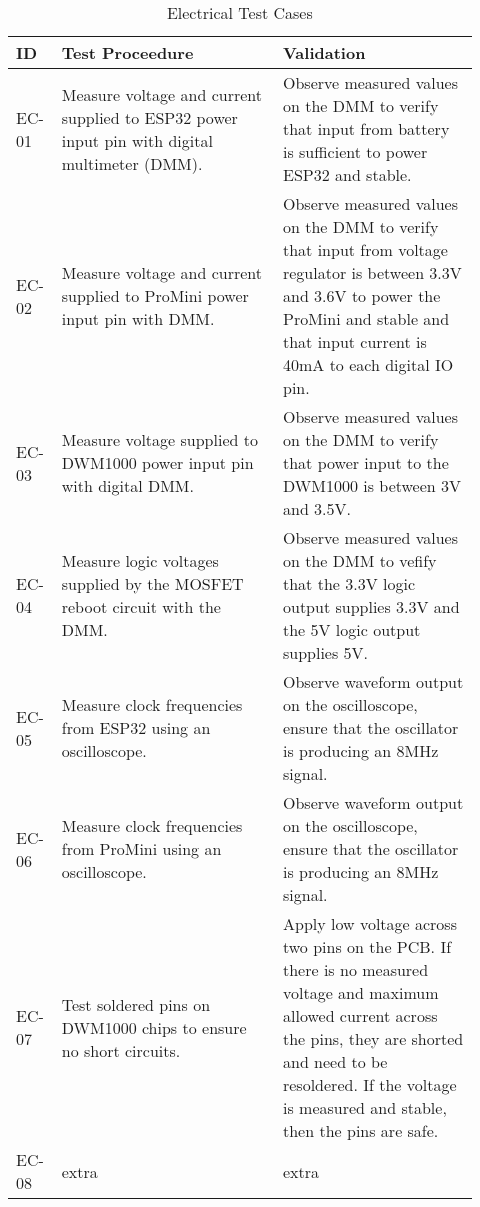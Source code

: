 \begin{table}[h!]
    \centering
    \begin{tabular}{|p{0.07\linewidth}|p{0.45\linewidth}|p{0.40\linewidth}|} 
    \hline
    ID & Test Proceedure & Validation\\ 

    \hline
    EC-01
    & Measure voltage and current supplied to ESP32 power input pin with digital multimeter (DMM).
    & Observe measured values on the DMM to verify that input from battery is sufficient to power ESP32 and stable. \\ 

    \hline
    EC-02
    & Measure voltage and current supplied to ProMini power input pin with DMM.
    & Observe measured values on the DMM to verify that input from voltage regulator is between 3.3V and 3.6V to power the ProMini and   stable and that input current is 40mA to each digital IO pin. \\

    \hline
    EC-03
    & Measure voltage supplied to DWM1000 power input pin with digital DMM.
    & Observe measured values on the DMM to verify that power input to the DWM1000 is between 3V and 3.5V. \\

    \hline
    EC-04
    & Measure logic voltages supplied by the MOSFET reboot circuit with the DMM.
    & Observe measured values on the DMM to vefify that the 3.3V logic output supplies 3.3V and the 5V logic output supplies 5V. \\

    \hline
    EC-05
    & Measure clock frequencies from ESP32 using an oscilloscope.
    & Observe waveform output on the oscilloscope, ensure that the oscillator is producing an 8MHz signal. \\

    \hline
    EC-06
    & Measure clock frequencies from ProMini using an oscilloscope.
    & Observe waveform output on the oscilloscope, ensure that the oscillator is producing an 8MHz signal. \\

    \hline
    EC-07
    & Test soldered pins on DWM1000 chips to ensure no short circuits.
    & Apply low voltage across two pins on the PCB. If there is no measured voltage and maximum allowed current across the pins, they are shorted and need to be resoldered. If the voltage is measured and stable, then the pins are safe. \\

    \hline
    EC-08
    & extra
    &  extra \\

    \hline
    \end{tabular}
    \caption{Electrical Test Cases}
\end{table}
%